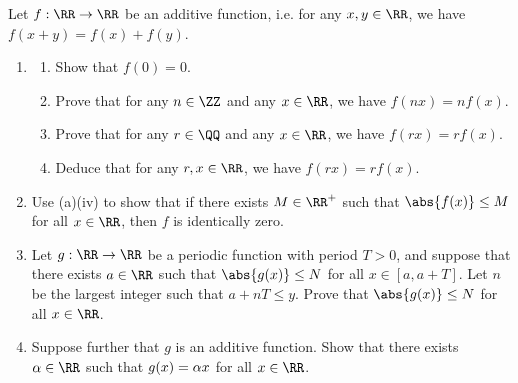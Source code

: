 \begin{problem}
    Let $f : \RR \to \RR$ be an additive function, i.e. for any $x, y \in \RR$, we have $f(x + y) = f(x) + f(y)$.

    \begin{enumerate}
        \item \begin{enumerate}
            \item Show that $f(0) = 0$.
            \item Prove that for any $n \in \ZZ$ and any $x \in \RR$, we have $f(nx) = nf(x)$.
            \item Prove that for any $r \in \QQ$ and any $x \in \RR$, we have $f(rx) = rf(x)$.
            \item Deduce that for any $r, x \in \RR$, we have $f(rx) = rf(x)$.
        \end{enumerate}
        \item Use (a)(iv) to show that if there exists $M \in \RR^+$ such that $\abs{f(x)} \leq M$ for all $x \in \RR$, then $f$ is identically zero.
        \item Let $g : \RR \to \RR$ be a periodic function with period $T > 0$, and suppose that there exists $a \in \RR$ such that $\abs{g(x)} \leq N$ for all $x \in [a, a + T]$. Let $n$ be the largest integer such that $a + nT \leq y$. Prove that $\abs{g(x)} \leq N$ for all $x \in \RR$.
        \item Suppose further that $g$ is an additive function. Show that there exists $\a \in \RR$ such that $g(x) = \alpha x$ for all $x \in \RR$.
    \end{enumerate}
\end{problem}
